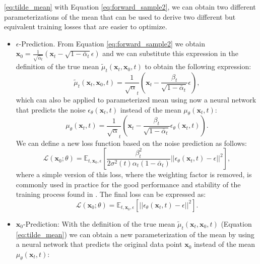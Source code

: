 \ref{eq:tilde_mean} with Equation \ref{eq:forward_sample2}, we can obtain two different parameterizations of the mean that can be used to derive two different but equivalent training 
losses that are easier to optimize. 
\begin{itemize}
    \item $\epsilon$-Prediction. From Equation \ref{eq:forward_sample2} we obtain $\mathbf{x}_0 = \frac{1}{\sqrt{\bar{\alpha}_t}}(\mathbf{x}_t - \sqrt{1-\bar{\alpha}_t}\epsilon)$ and we can 
    substitute this expression in the definition of the true mean $\tilde{\mu}_t(\mathbf{x}_t, \mathbf{x}_0, t)$ to obtain the following expression:
    \begin{equation}
        \tilde{\mu}_t(\mathbf{x}_t, \mathbf{x}_0, t) = \frac{1}{\sqrt{\alpha}_t} \left( \mathbf{x}_t - \frac{\beta_t}{\sqrt{1-\bar{\alpha}_t}} \epsilon \right),
    \end{equation}
    which can also be applied to parameterized mean using now a neural network that predicts the noise $\epsilon_{\theta}(\mathbf{x}_t, t)$ instead of the mean $\mu_{\theta}(\mathbf{x}_t, t)$:
    \begin{equation}
    \mu_{\theta}(\mathbf{x}_t, t) = \frac{1}{\sqrt{\alpha}_t} \left( \mathbf{x}_t - \frac{\beta_t}{\sqrt{1-\bar{\alpha}_t}} \epsilon_{\theta}(\mathbf{x}_t, t) \right).
    \end{equation}
    We can define a new loss function based on the noise prediction as follows:
    \begin{equation}
        \mathcal{L}(\mathbf{x}_0;\theta) = \mathbb{E}_{t, \mathbf{x}_0, \epsilon} \left[\frac{\beta_t^2}{2\sigma^2(t)\alpha_t(1-\bar{\alpha}_t)} ||\epsilon_{\theta}(\mathbf{x}_t, t) - \epsilon||^2 \right],
    \end{equation}
    where a simple version of this loss, where the weighting factor is removed, is commonly used in practice for the good performance and stability of the training process found in \cite{ho2020denoisingdiffusionprobabilisticmodels}.
    The final loss can be expressed as: 
    \begin{equation}
        \mathcal{L}(\mathbf{x}_0;\theta) = \mathbb{E}_{t, \mathbf{x}_0, \epsilon} \left[||\epsilon_{\theta}(\mathbf{x}_t, t) - \epsilon||^2 \right].
    \end{equation}
    \item $\mathbf{x}_0$-Prediction: With the definition of the true mean $\tilde{\mu}_t(\mathbf{x}_t, \mathbf{x}_0, t)$ (Equation \ref{eq:tilde_mean}) we can obtain 
    a new parameterization of the mean by using a neural network that predicts the original data point $\mathbf{x}_0$ instead of the mean $\mu_{\theta}(\mathbf{x}_t, t)$:

\end{itemize}
